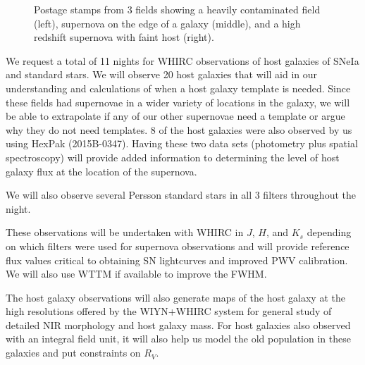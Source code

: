 \documentclass[11pt]{article}
\begin{document}
\clearpage

\begin{figure}
\caption{Postage stamps from 3 fields showing a heavily contaminated field (left), supernova on the edge of a galaxy (middle), and a high redshift supernova with faint host (right).}
\end{figure}


\clearpage


%

%

\expdesign

We request a total of 11 nights for WHIRC observations of host galaxies of SNeIa and standard stars.  
We will observe 20 host galaxies that will aid in our understanding and calculations of when a host galaxy template is needed. 
Since these fields had supernovae in a wider variety of locations in the galaxy, we will be able to extrapolate if any of our other supernovae need a template or argue why they do not need templates. 
8 of the host galaxies were also observed by us using HexPak (2015B-0347). 
Having these two data sets (photometry plus spatial spectroscopy) will provide added information to determining the level of host galaxy flux at the location of the supernova. 

We will also observe several Persson standard stars in all 3 filters throughout the night.

These observations will be undertaken with WHIRC in $J$, $H$, and $K_s$ depending on which filters were used for supernova observations
and will provide reference flux values critical to obtaining
SN lightcurves and improved PWV calibration.  
We will also use WTTM if available to improve the FWHM.

The host galaxy observations will also generate
maps of the host galaxy at the high resolutions offered by the WIYN+WHIRC system for general study of detailed NIR morphology and host galaxy mass.
For host galaxies also observed with an integral field unit, it will also help us model the old population in these galaxies and put constraints on $R_V$. 
\end{document}
